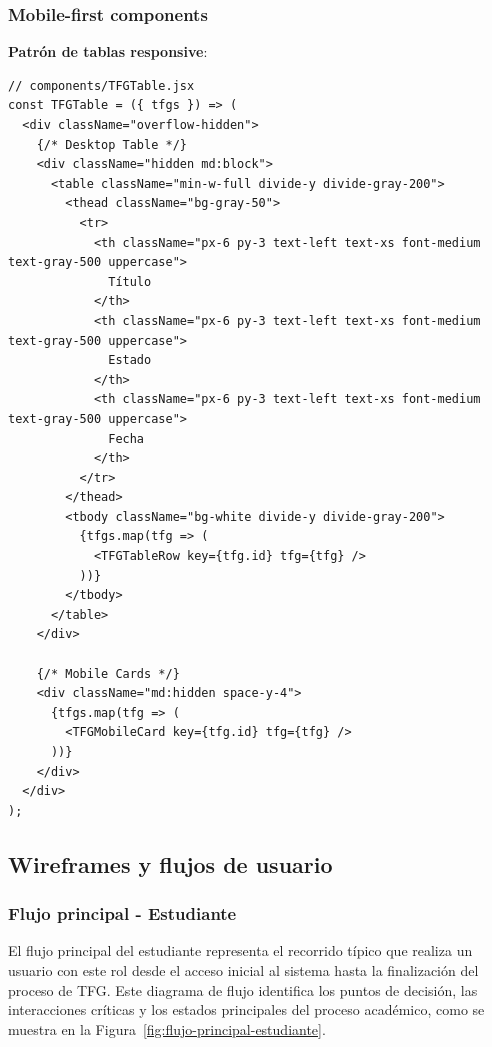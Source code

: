 \documentclass[12pt,a4paper,oneside]{report}
\begin{document}
\subsubsection{Mobile-first components}\label{mobile-first-components}

\textbf{Patrón de tablas responsive}:

\begin{lstlisting}
// components/TFGTable.jsx
const TFGTable = ({ tfgs }) => (
  <div className="overflow-hidden">
    {/* Desktop Table */}
    <div className="hidden md:block">
      <table className="min-w-full divide-y divide-gray-200">
        <thead className="bg-gray-50">
          <tr>
            <th className="px-6 py-3 text-left text-xs font-medium text-gray-500 uppercase">
              Título
            </th>
            <th className="px-6 py-3 text-left text-xs font-medium text-gray-500 uppercase">
              Estado
            </th>
            <th className="px-6 py-3 text-left text-xs font-medium text-gray-500 uppercase">
              Fecha
            </th>
          </tr>
        </thead>
        <tbody className="bg-white divide-y divide-gray-200">
          {tfgs.map(tfg => (
            <TFGTableRow key={tfg.id} tfg={tfg} />
          ))}
        </tbody>
      </table>
    </div>
    
    {/* Mobile Cards */}
    <div className="md:hidden space-y-4">
      {tfgs.map(tfg => (
        <TFGMobileCard key={tfg.id} tfg={tfg} />
      ))}
    </div>
  </div>
);
\end{lstlisting}

\subsection{Wireframes y flujos de
usuario}\label{wireframes-y-flujos-de-usuario}

\subsubsection{Flujo principal -
Estudiante}\label{flujo-principal---estudiante}

El flujo principal del estudiante representa el recorrido típico que realiza un usuario con este rol desde el acceso inicial al sistema hasta la finalización del proceso de TFG. Este diagrama de flujo identifica los puntos de decisión, las interacciones críticas y los estados principales del proceso académico, como se muestra en la Figura~\ref{fig:flujo-principal-estudiante}.
\end{document}
